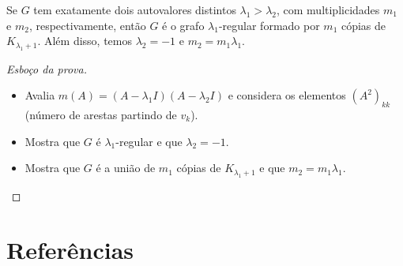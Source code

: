 \documentclass{beamer}
\begin{document}
\begin{frame}
    \begin{prop}
        Se \(G\) tem exatamente dois autovalores distintos \(\lambda_1 > \lambda_2\), com multiplicidades \(m_1\) e \(m_2\), respectivamente, então \(G\) é o grafo \(\lambda_1\)-regular formado por \(m_1\) cópias de \(K_{\lambda_1 + 1}\). Além disso, temos \(\lambda_2 = -1\) e \(m_2 = m_1\lambda_1\).
    \end{prop}

    \begin{proof}[Esboço da prova]
        \begin{itemize}
            \item Avalia \(m(A) = (A - \lambda_1 I)(A - \lambda_2 I)\) e considera os elementos \((A^2)_{kk}\) (número de arestas partindo de \(v_k\)).
            \item Mostra que \(G\) é \(\lambda_1\)-regular e que \(\lambda_2 = -1\).
            \item Mostra que \(G\) é a união de \(m_1\) cópias de \(K_{\lambda_1 + 1}\) e que \(m_2 = m_1\lambda_1\).
        \end{itemize}
    \end{proof}
\end{frame}

\section*{Referências}

\begin{frame}
    \printbibliography
\end{frame}
\end{document}
